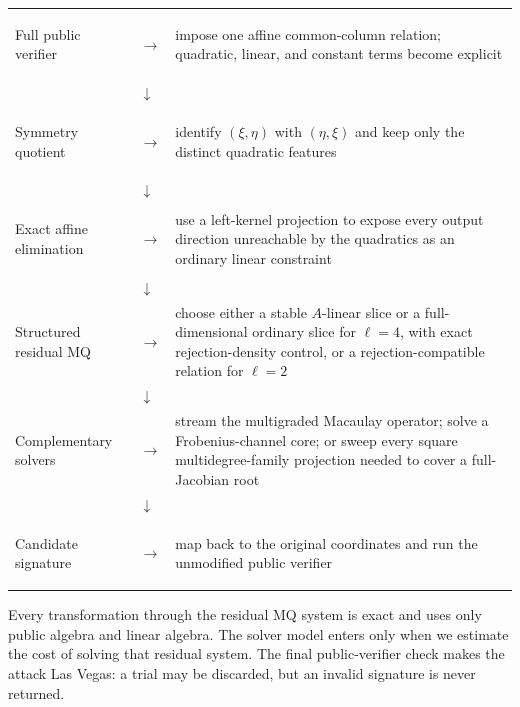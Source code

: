 \documentclass[11pt]{article}
\begin{document}
\begin{center}
\renewcommand{\arraystretch}{1.25}
\begin{tabularx}{0.96\textwidth}{@{}>{\bfseries\raggedright\arraybackslash}p{}>{\centering\arraybackslash}p{}X@{}}
Full public verifier & $\longrightarrow$ & impose one affine common-column
relation; quadratic, linear, and constant terms become explicit\\
& $\downarrow$ & \\
Symmetry quotient & $\longrightarrow$ & identify $(\xi,\eta)$ with
$(\eta,\xi)$ and keep only the distinct quadratic features\\
& $\downarrow$ & \\
Exact affine elimination & $\longrightarrow$ & use a left-kernel projection
to expose every output direction unreachable by the quadratics as an ordinary
linear constraint\\
& $\downarrow$ & \\
Structured residual MQ & $\longrightarrow$ & choose either a stable
$A$-linear slice or a full-dimensional ordinary slice for $\ell=4$, with
exact rejection-density control, or a rejection-compatible relation for
$\ell=2$\\
& $\downarrow$ & \\
Complementary solvers & $\longrightarrow$ & stream the multigraded Macaulay
operator; solve a Frobenius-channel core; or sweep every square
multidegree-family projection needed to cover a full-Jacobian root\\
& $\downarrow$ & \\
Candidate signature & $\longrightarrow$ & map back to the original
coordinates and run the unmodified public verifier
\end{tabularx}
\end{center}

Every transformation through the residual MQ system is exact and uses only
public algebra and linear algebra.  The solver model enters only when we
estimate the cost of solving that residual system.  The final public-verifier
check makes the attack Las Vegas: a trial may be discarded, but an invalid
signature is never returned.
\end{document}
